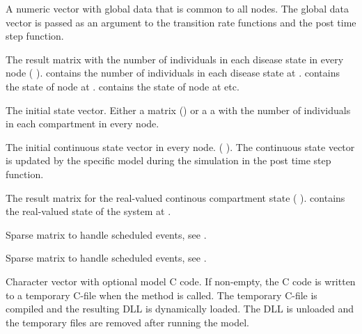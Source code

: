 \documentclass[letterpaper]{book}
\begin{document}
\begin{Arguments}
\begin{ldescription}
\item[\code{gdata}] A numeric vector with global data that is common to
all nodes. The global data vector is passed as an argument to
the transition rate functions and the post time step function.

\item[\code{U}] The result matrix with the number of individuals in each
disease state in every node (
).   contains the number of
individuals in each disease state at
.  contains the state of node
 at . 
contains the state of node  at  etc.

\item[\code{u0}] The initial state vector. Either a matrix () or a a  with the number of
individuals in each compartment in every node.

\item[\code{v0}] The initial continuous state vector in every node.
( ). The continuous state
vector is updated by the specific model during the simulation
in the post time step function.

\item[\code{V}] The result matrix for the real-valued continous
compartment state ( \eqn{\times}{}
).   contains the real-valued
state of the system at .

\item[\code{E}] Sparse matrix to handle scheduled events, see
.

\item[\code{N}] Sparse matrix to handle scheduled events, see
.

\item[\code{C\_code}] Character vector with optional model C code. If
non-empty, the C code is written to a temporary C-file when
the  method is called.  The temporary C-file is
compiled and the resulting DLL is dynamically loaded. The DLL
is unloaded and the temporary files are removed after running
the model.
\end{ldescription}
\end{Arguments}
%
\begin{Value}
\end{Value}
\end{document}
